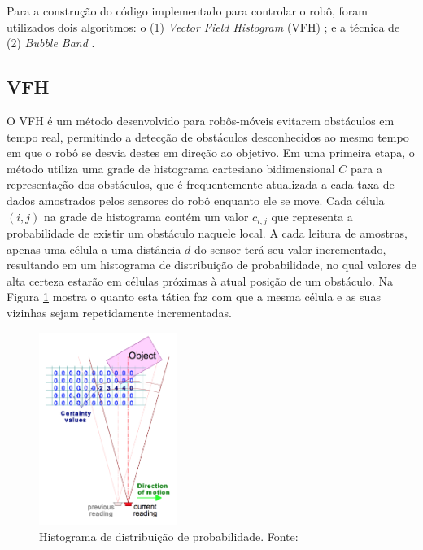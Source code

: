 Para a construção do código implementado para controlar o robô, foram
utilizados dois algoritmos: o (1) \textit{Vector Field Histogram} (VFH)
\cite{c1}; e a técnica de (2) \textit{Bubble Band} \cite{c3}.
\\

\subsection{VFH}
\label{sec:vfh}

O VFH é um método desenvolvido para robôs-móveis evitarem obstáculos em tempo real, permitindo a
detecção de obstáculos desconhecidos ao mesmo tempo em que o robô se desvia destes em direção
ao objetivo. Em uma primeira etapa, o método utiliza uma grade de histograma cartesiano bidimensional $C$ para a representação dos obstáculos, que é frequentemente atualizada a cada taxa de dados amostrados pelos sensores do robô enquanto ele se move. Cada célula $(i,j)$ na grade de histograma contém um valor $c_{i,j}$ que representa a probabilidade de existir um obstáculo naquele local. A cada leitura de amostras, apenas uma célula a uma distância $d$ do sensor terá seu valor incrementado, resultando em um histograma de distribuição de probabilidade, no qual valores de alta certeza estarão em células próximas à atual posição de um obstáculo. Na Figura \ref{fig:histog_dist_prob} mostra o quanto esta tática faz com que a mesma célula e as suas vizinhas sejam repetidamente incrementadas.

\begin{figure}[H]
    \centering
    \includegraphics[width=0.4\textwidth]{img/histog_dist_prob}
    \caption{Histograma de distribuição de probabilidade. Fonte: \cite{c1}}
    \label{fig:histog_dist_prob}
\end{figure}

